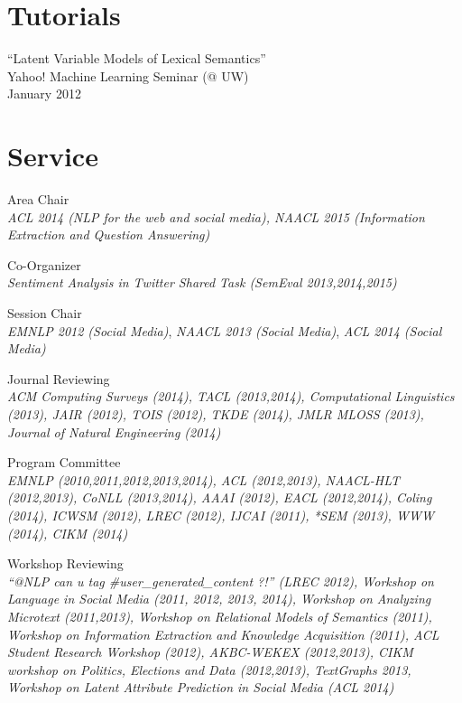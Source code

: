 \documentclass[margin,line]{res}
\begin{document}
\begin{resume}
\section{\sc Tutorials}
``Latent Variable Models of Lexical Semantics'' \\
Yahoo! Machine Learning Seminar (@ UW) \\
January 2012


\begin{comment}
``Profiling NAVDAS'' \\
Naval Research Laboratory Monterey, CA \\
August 2006

``Profiling Parallel Fortran/MPI programs using TAU'' (Training Class for NRL Scientists) \\
Naval Research Laboratory Monterey, CA \\
August 2006
\end{comment}

\section{\sc Service}
Area Chair \\
\emph{ACL 2014 (NLP for the web and social media), NAACL 2015 (Information Extraction and Question Answering)}

Co-Organizer \\
\emph{Sentiment Analysis in Twitter Shared Task (SemEval 2013,2014,2015)}

Session Chair \\
\emph{EMNLP 2012 (Social Media)}, \emph{NAACL 2013 (Social Media)}, \emph{ACL 2014 (Social Media)}

Journal Reviewing \\
\emph{ACM Computing Surveys (2014), TACL (2013,2014), Computational Linguistics (2013), JAIR (2012), TOIS (2012), TKDE (2014), JMLR MLOSS (2013), Journal of Natural Engineering (2014)}

Program Committee \\
\emph{EMNLP (2010,2011,2012,2013,2014), ACL (2012,2013), NAACL-HLT (2012,2013), CoNLL (2013,2014), AAAI (2012), EACL (2012,2014), Coling (2014), ICWSM (2012), LREC (2012), IJCAI (2011), *SEM (2013), WWW (2014), CIKM (2014)}

Workshop Reviewing \\
\emph{``@NLP can u tag \#user\_generated\_content ?!'' (LREC 2012), Workshop on Language in Social Media (2011, 2012, 2013, 2014), Workshop on Analyzing Microtext (2011,2013), Workshop on Relational Models of Semantics (2011), Workshop on Information Extraction and Knowledge Acquisition (2011), ACL Student Research Workshop (2012), AKBC-WEKEX (2012,2013), CIKM workshop on Politics, Elections and Data (2012,2013), TextGraphs 2013, Workshop on Latent Attribute Prediction in Social Media (ACL 2014)}


\end{resume}
\end{document}
